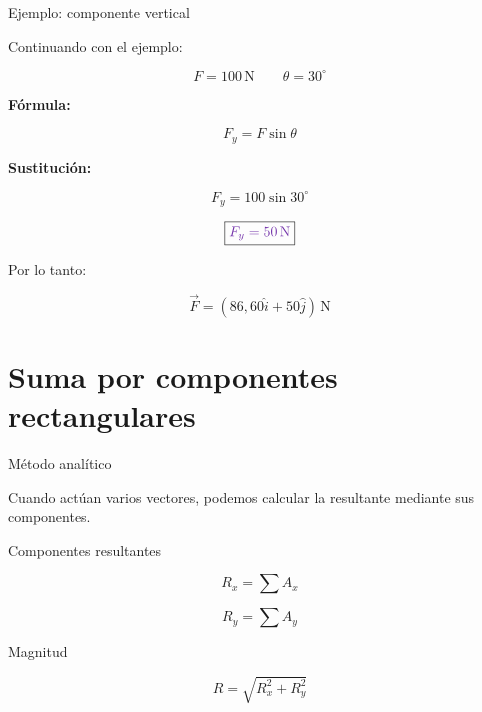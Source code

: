 \documentclass[aspectratio=169,11pt]{beamer}
\newcommand{\resp}[1]{
 \[
 \boxed{\color{morado}{#1}}
 \]
}
\begin{document}
\begin{frame}{Ejemplo: componente vertical}

Continuando con el ejemplo:

\[
F=100\,\mathrm{N}
\qquad
\theta=30^\circ
\]

\textbf{Fórmula:}

\[
F_y=F\sin\theta
\]

\textbf{Sustitución:}

\[
F_y=100\sin30^\circ
\]

\resp{F_y=50\,\mathrm{N}}

Por lo tanto:

\[
\vec F=
(86,60\hat i+50\hat j)\,\mathrm{N}
\]

\end{frame}

\section{Suma por componentes rectangulares}

\begin{frame}{Método analítico}

Cuando actúan varios vectores,
podemos calcular la resultante
mediante sus componentes.

\begin{block}{Componentes resultantes}

\[
\boxed{R_x=\sum A_x}
\]

\[
\boxed{R_y=\sum A_y}
\]

\end{block}

\begin{block}{Magnitud}

\[
\boxed{R=\sqrt{R_x^2+R_y^2}}
\]

\end{block}

\end{frame}
\end{document}
